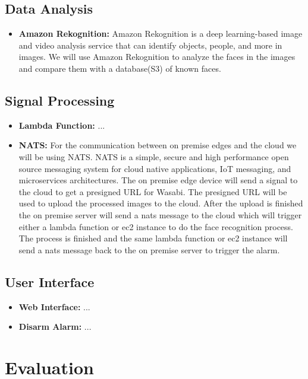 \documentclass[conference]{IEEEtran}
\begin{document}
\subsection{Data Analysis}
\begin{itemize}
    \item \textbf{Amazon Rekognition:} Amazon Rekognition is a deep learning-based image and video analysis service that can identify objects, people, and more in images.
                                        We will use Amazon Rekognition to analyze the faces in the images and compare them with a database(S3) of known faces. 
\end{itemize}
\subsection{Signal Processing}
\begin{itemize}
    \item \textbf{Lambda Function:} ...
    \item \textbf{NATS:} For the communication between on premise edges and the cloud we will be using NATS. NATS is a simple, secure and high performance open source messaging system for cloud native applications, IoT messaging, and microservices architectures.
          The on premise edge device will send a signal to the cloud to get a presigned URL for Wasabi. The presigned URL will be used to upload the processed images to the cloud.
          After the upload is finished the on premise server will send a nats message to the cloud which will trigger either a lambda function or ec2 instance to do the face recognition process. 
          The process is finished and the same lambda function or ec2 instance will send a nats message back to the on premise server to trigger the alarm.
\end{itemize}
\subsection{User Interface}
\begin{itemize}
    \item \textbf{Web Interface:} ...
    \item \textbf{Disarm Alarm:} ...
\end{itemize}

\section{Evaluation}
\label{sec:evaluation}
\end{document}
